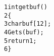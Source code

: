 \begin{alltt}
{\scriptsize   1} int getbuf()
{\scriptsize   2} \verb:{:
{\scriptsize   3}     char buf[12];
{\scriptsize   4}     Gets(buf);
{\scriptsize   5}     return 1;
{\scriptsize   6} \verb:}:
\end{alltt}
